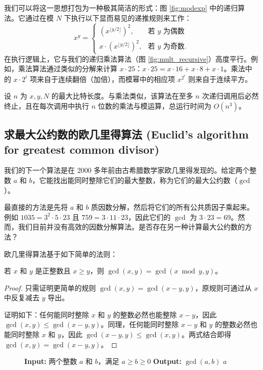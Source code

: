我们可以将这一思想打包为一种极其简洁的形式：图 \ref{fig:modexp} 中的递归算法。它通过在模 $N$ 下执行以下显而易见的递推规则来工作：
\[
x^y = \begin{cases}
(x^{\lfloor y/2 \rfloor})^2, & \text{若 } y \text{ 为偶数} \\
x \cdot (x^{\lfloor y/2 \rfloor})^2, & \text{若 } y \text{ 为奇数}.
\end{cases}
\]
在执行逻辑上，它与我们的递归乘法算法（图 \ref{fig:mult_recursive}）高度平行。例如，乘法算法通过类似的分解来计算 $x \cdot 25$：$x \cdot 25 = x \cdot 16 + x \cdot 8 + x \cdot 1$。乘法中的 $x \cdot 2^i$ 项来自于连续翻倍（加倍），而模幂中的相应项 $x^{2^i}$ 则来自于连续平方。

设 $n$ 为 $x, y, N$ 的最大比特长度。与乘法类似，该算法在至多 $n$ 次递归调用后必然终止，且在每次调用中执行 $n$ 位数的乘法与模运算，总运行时间为 $O(n^3)$。

\subsection{求最大公约数的欧几里得算法 (Euclid's algorithm for greatest common divisor)}
我们的下一个算法是在 2000 多年前由古希腊数学家欧几里得发现的。给定两个整数 $a$ 和 $b$，它能找出能同时整除它们的最大整数，称为它们的最大公约数（$\gcd$）。

最直接的方法是先将 $a$ 和 $b$ 质因数分解，然后将它们的所有公共质因子乘起来。例如 $1035 = 3^2 \cdot 5 \cdot 23$ 且 $759 = 3 \cdot 11 \cdot 23$，因此它们的 $\gcd$ 为 $3 \cdot 23 = 69$。然而，我们目前并没有高效的因数分解算法。是否存在另一种计算最大公约数的方法？

欧几里得算法基于如下简单的法则：

\begin{property}
若 $x$ 和 $y$ 是正整数且 $x \ge y$，则 $\gcd(x, y) = \gcd(x \bmod y, y)$。
\end{property}

\begin{proof}
只需证明更简单的规则 $\gcd(x, y) = \gcd(x - y, y)$，原规则可通过从 $x$ 中反复减去 $y$ 导出。

证明如下：任何能同时整除 $x$ 和 $y$ 的整数必然也能整除 $x - y$，因此 $\gcd(x, y) \le \gcd(x - y, y)$。同理，任何能同时整除 $x - y$ 和 $y$ 的整数必然也能同时整除 $x$ 和 $y$，因此 $\gcd(x - y, y) \le \gcd(x, y)$。两式结合即得 $\gcd(x, y) = \gcd(x - y, y)$。
\end{proof}

\begin{figure}[htbp]
\centering
\begin{tcolorbox}[colback=white,colframe=gray!50!black,title={\textbf{图 1.5}\quad 寻找两数最大公约数的欧几里得算法}]
\begin{algorithmic}[1]
    \State \textbf{Input:} 两个整数 $a$ 和 $b$，满足 $a \ge b \ge 0$
    \State \textbf{Output:} $\gcd(a, b)$
     \Return $a$ \EndIf
    \State \Return {}
\EndFunction
\end{algorithmic}
\end{tcolorbox}
\label{fig:euclid}
\end{figure}

